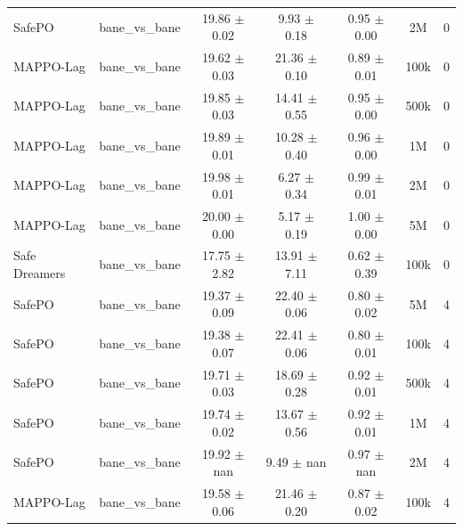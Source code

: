 \documentclass{article}
\begin{document}
\begin{longtable}{lcccccc}
SafePO & bane\_vs\_bane & \textcolor{red!70!black}{19.86 $\pm$ 0.02} & \textcolor{red!70!black}{9.93 $\pm$ 0.18} & \textcolor{red!70!black}{0.95 $\pm$ 0.00} & 2M & 0 \\
MAPPO-Lag & bane\_vs\_bane & \textcolor{red!70!black}{19.62 $\pm$ 0.03} & \textcolor{green!60!black}{21.36 $\pm$ 0.10} & \textcolor{red!70!black}{0.89 $\pm$ 0.01} & 100k & 0 \\
MAPPO-Lag & bane\_vs\_bane & \textcolor{red!70!black}{19.85 $\pm$ 0.03} & \textcolor{green!60!black}{14.41 $\pm$ 0.55} & \textcolor{red!70!black}{0.95 $\pm$ 0.00} & 500k & 0 \\
MAPPO-Lag & bane\_vs\_bane & \textcolor{red!70!black}{19.89 $\pm$ 0.01} & \textcolor{red!70!black}{10.28 $\pm$ 0.40} & \textcolor{red!70!black}{0.96 $\pm$ 0.00} & 1M & 0 \\
MAPPO-Lag & bane\_vs\_bane & \textcolor{red!70!black}{19.98 $\pm$ 0.01} & \textcolor{red!70!black}{6.27 $\pm$ 0.34} & \textcolor{red!70!black}{0.99 $\pm$ 0.01} & 2M & 0 \\
MAPPO-Lag & bane\_vs\_bane & \textcolor{red!70!black}{20.00 $\pm$ 0.00} & \textcolor{red!70!black}{5.17 $\pm$ 0.19} & \textcolor{red!70!black}{1.00 $\pm$ 0.00} & 5M & 0 \\
Safe Dreamers & bane\_vs\_bane & 17.75 $\pm$ 2.82 & 13.91 $\pm$ 7.11 & 0.62 $\pm$ 0.39 & 100k & 0 \\
\midrule
SafePO & bane\_vs\_bane & \textcolor{green!60!black}{19.37 $\pm$ 0.09} & \textcolor{green!60!black}{22.40 $\pm$ 0.06} & \textcolor{green!60!black}{0.80 $\pm$ 0.02} & 5M & 4 \\
SafePO & bane\_vs\_bane & \textcolor{green!60!black}{19.38 $\pm$ 0.07} & \textcolor{green!60!black}{22.41 $\pm$ 0.06} & \textcolor{green!60!black}{0.80 $\pm$ 0.01} & 100k & 4 \\
SafePO & bane\_vs\_bane & \textcolor{green!60!black}{19.71 $\pm$ 0.03} & \textcolor{green!60!black}{18.69 $\pm$ 0.28} & \textcolor{green!60!black}{0.92 $\pm$ 0.01} & 500k & 4 \\
SafePO & bane\_vs\_bane & \textcolor{green!60!black}{19.74 $\pm$ 0.02} & \textcolor{green!60!black}{13.67 $\pm$ 0.56} & \textcolor{green!60!black}{0.92 $\pm$ 0.01} & 1M & 4 \\
SafePO & bane\_vs\_bane & \textcolor{red!70!black}{19.92 $\pm$ nan} & \textcolor{green!60!black}{9.49 $\pm$ nan} & \textcolor{green!60!black}{0.97 $\pm$ nan} & 2M & 4 \\
MAPPO-Lag & bane\_vs\_bane & \textcolor{green!60!black}{19.58 $\pm$ 0.06} & \textcolor{green!60!black}{21.46 $\pm$ 0.20} & \textcolor{green!60!black}{0.87 $\pm$ 0.02} & 100k & 4 \\

\end{longtable}
\end{document}
